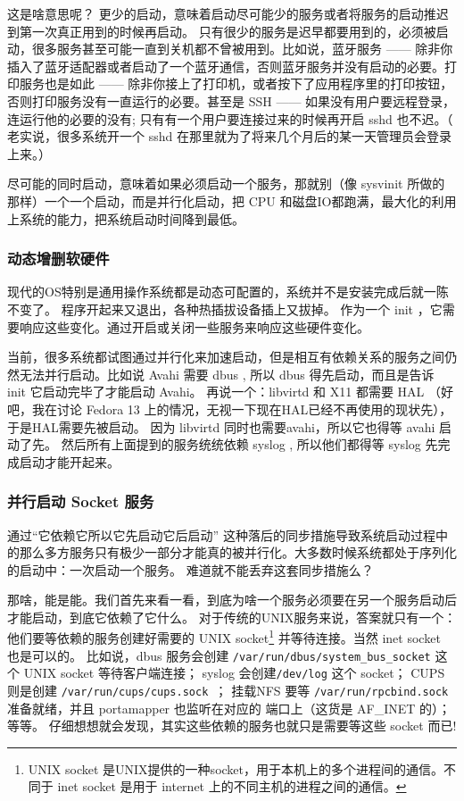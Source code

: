 \begin{insertnote}
这是啥意思呢？ 更少的启动，意味着启动尽可能少的服务或者将服务的启动推迟到第一次真正用到的时候再启动。
只有很少的服务是迟早都要用到的，必须被启动，很多服务甚至可能一直到关机都不曾被用到。比如说，蓝牙服务 —— 除非你插入了蓝牙适配器或者启动了一个蓝牙通信，否则蓝牙服务并没有启动的必要。打印服务也是如此 —— 除非你接上了打印机，或者按下了应用程序里的打印按钮，否则打印服务没有一直运行的必要。甚至是 SSH —— 如果没有用户要远程登录，连运行他的必要的没有; 只有有一个用户要连接过来的时候再开启 sshd 也不迟。（ 老实说，很多系统开一个 sshd 在那里就为了将来几个月后的某一天管理员会登录上来。）

尽可能的同时启动，意味着如果必须启动一个服务，那就别（像 sysvinit 所做的那样）一个一个启动，而是并行化启动，把 CPU 和磁盘IO都跑满，最大化的利用上系统的能力，把系统启动时间降到最低。


\subsubsection*{动态增删软硬件}

现代的OS特别是通用操作系统都是动态可配置的，系统并不是安装完成后就一陈不变了。
程序开起来又退出，各种热插拔设备插上又拔掉。
作为一个 init ，它需要响应这些变化。通过开启或关闭一些服务来响应这些硬件变化。

当前，很多系统都试图通过并行化来加速启动，但是相互有依赖关系的服务之间仍然无法并行启动。比如说 Avahi 需要 dbus , 所以 dbus 得先启动，而且是告诉 init 它启动完毕了才能启动 Avahi。
再说一个：libvirtd 和 X11 都需要 HAL （好吧，我在讨论 Fedora 13 上的情况，无视一下现在HAL已经不再使用的现状先），于是HAL需要先被启动。
因为 libvirtd 同时也需要avahi，所以它也得等 avahi 启动了先。
然后所有上面提到的服务统统依赖 syslog , 所以他们都得等 syslog 先完成启动才能开起来。

\subsubsection*{并行启动 Socket 服务\footnotemark}


通过“它依赖它所以它先启动它后启动” 这种落后的同步措施导致系统启动过程中的那么多方服务只有极少一部分才能真的被并行化。大多数时候系统都处于序列化的启动中：一次启动一个服务。
难道就不能丢弃这套同步措施么？

那啥，能是能。我们首先来看一看，到底为啥一个服务必须要在另一个服务启动后才能启动，到底它依赖了它什么。
对于传统的UNIX服务来说，答案就只有一个：他们要等依赖的服务创建好需要的 UNIX socket\footnote{UNIX socket 是UNIX提供的一种socket，用于本机上的多个进程间的通信。不同于 inet socket 是用于 internet 上的不同主机的进程之间的通信。} 并等待连接。当然 inet socket 也是可以的。
比如说，dbus 服务会创建 \texttt{/var/run/dbus/system\_bus\_socket} 这个 UNIX socket 等待客户端连接； syslog 会创建\texttt{/dev/log} 这个 socket； CUPS 则是创建  \texttt{/var/run/cups/cups.sock }；  挂载NFS 要等 \texttt{/var/run/rpcbind.sock} 准备就绪，并且 portamapper 也监听在对应的 端口上（这货是 AF\_INET 的）； 等等。
仔细想想就会发现，其实这些依赖的服务也就只是需要等这些 socket 而已!


\end{insertnote}
